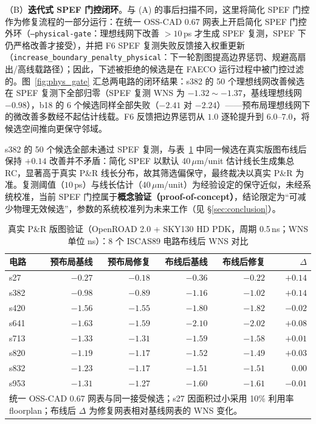 \documentclass[journal]{IEEEtran}
\begin{document}
（B）\textbf{迭代式 SPEF 门控闭环}。与 (A) 的事后扫描不同，这里将简化 SPEF 门控作为修复流程的一部分运行：在统一 OSS-CAD 0.67 网表上开启简化 SPEF 门控外环（\texttt{--physical-gate}：理想线网下改善 $>10\,$ps 才生成 SPEF 复测，SPEF 下仍严格改善才接受），并把 F6 SPEF 复测失败反馈接入权重更新（\texttt{increase\_boundary\_penalty\_physical}：下一轮割图提高边界惩罚、规避高扇出/高线载路径）；因此，下述被拒绝的候选是在 FAECO 运行过程中被门控过滤的。图~\ref{fig:phys_gate} 汇总两电路的闭环结果：s382 的 50 个理想线网改善候选在 SPEF 复测下全部归零（SPEF 复测 WNS 为 $-1.32\sim-1.37$，基线理想线网 $-0.98$），b18 的 6 个候选同样全部失败（$-2.41$ 对 $-2.24$）——预布局理想线网下的微改善多数经不起估计线载。F6 反馈把边界惩罚从 $1.0$ 逐轮提升到 $6.0$--$7.0$，将候选空间推向更保守邻域。

s382 的 50 个候选全部未通过 SPEF 复测，与表~\ref{tab:pr8} 中同一候选在真实版图布线后保持 $+0.14$ 改善并不矛盾：简化 SPEF 以默认 40\,$\mu$m/unit 估计线长生成集总 RC，显著高于真实 P\&R 线长分布，故其筛选偏保守，最终裁决以真实 P\&R 为准。复测阈值（$10\,$ps）与线长估计（$40\,\mu$m/unit）为经验设定的保守近似，未经系统校准，当前 SPEF 门控属于\textbf{概念验证（proof-of-concept）}，结论限定为“可减少物理无效候选”，参数的系统校准列为未来工作（见 \S\ref{sec:conclusion}）。

\begin{table}[!t]
\centering
\caption{真实 P\&R 版图验证（OpenROAD 2.0 + SKY130 HD PDK，周期 0.5\,ns；WNS 单位 ns）：8 个 ISCAS89 电路布线后 WNS 对比}
\label{tab:pr8}
\footnotesize
\setlength{\tabcolsep}{2.5pt}
\begin{tabular}{lrrrrr}
\toprule
\textbf{电路} & \textbf{预布局基线} & \textbf{预布局修复} & \textbf{布线后基线} & \textbf{布线后修复} & $\Delta$ \\
\midrule
s27  & $-0.27$ & $-0.18$ & $-0.36$ & $-0.22$ & $+0.14$ \\
s382 & $-0.98$ & $-0.89$ & $-1.16$ & $-1.02$ & $+0.14$ \\
s420 & $-1.56$ & $-1.55$ & $-1.80$ & $-1.82$ & $-0.02$ \\
s641 & $-1.63$ & $-1.59$ & $-2.10$ & $-2.02$ & $+0.08$ \\
s713 & $-1.33$ & $-1.31$ & $-1.59$ & $-1.58$ & $+0.01$ \\
s820 & $-1.19$ & $-1.17$ & $-1.52$ & $-1.49$ & $+0.03$ \\
s832 & $-1.23$ & $-1.17$ & $-1.51$ & $-1.51$ & $0.00$ \\
s953 & $-1.31$ & $-1.27$ & $-1.60$ & $-1.61$ & $-0.01$ \\
\bottomrule
\multicolumn{6}{p{0.92\columnwidth}}{\footnotesize 统一 OSS-CAD 0.67 网表与同一接受候选；s27 因面积过小采用 10\% 利用率 floorplan；布线后 $\Delta$ 为修复网表相对基线网表的 WNS 变化。}\\
\end{tabular}
\end{table}
\end{document}
